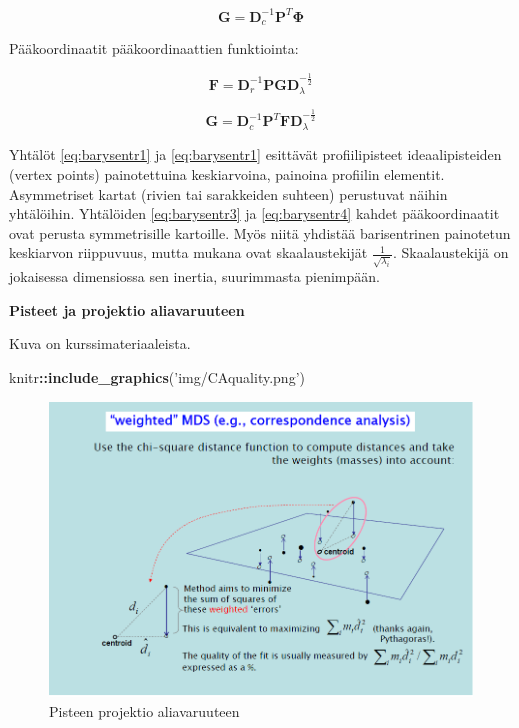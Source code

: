 \documentclass[
  finnish,
]{book}
\newenvironment{Shaded}{\begin{snugshade}}{\end{snugshade}}
\newcommand{\KeywordTok}[1]{\textcolor[rgb]{0.13,0.29,0.53}{\textbf{#1}}}
\newcommand{\NormalTok}[1]{#1}
\newcommand{\OperatorTok}[1]{\textcolor[rgb]{0.81,0.36,0.00}{\textbf{#1}}}
\newcommand{\StringTok}[1]{\textcolor[rgb]{0.31,0.60,0.02}{#1}}
\begin{document}
\begin{equation}
\boldsymbol{G} = \boldsymbol{D}_{c}^{-1} \boldsymbol{P}^{T}\boldsymbol{\Phi}
\label{eq:barysentr2}
\end{equation}

Pääkoordinaatit pääkoordinaattien funktiointa:

\begin{equation}
\boldsymbol{F} = \boldsymbol{D}_{r}^{-1} \boldsymbol{P}\boldsymbol{G}\boldsymbol{D}_{\lambda}^{-\frac{1}{2}}
\label{eq:barysentr3}
\end{equation}

\begin{equation}
\boldsymbol{G} = \boldsymbol{D}_{c}^{-1} \boldsymbol{P}^{T}\boldsymbol{F}\boldsymbol{D}_{\lambda}^{-\frac{1}{2}}
\label{eq:barysentr4}
\end{equation}

Yhtälöt \eqref{eq:barysentr1} ja \eqref{eq:barysentr1} esittävät profiilipisteet ideaalipisteiden (vertex points)
painotettuina keskiarvoina, painoina profiilin elementit. Asymmetriset kartat
(rivien tai sarakkeiden suhteen) perustuvat näihin yhtälöihin. Yhtälöiden \eqref{eq:barysentr3}
ja \eqref{eq:barysentr4} kahdet pääkoordinaatit ovat perusta symmetrisille kartoille. Myös niitä
yhdistää barisentrinen painotetun keskiarvon riippuvuus, mutta mukana ovat skaalaustekijät
\(\frac{1}{\sqrt{\lambda_{i}}}\). Skaalaustekijä on jokaisessa dimensiossa sen inertia, suurimmasta pienimpään.

\textbf{Pisteet ja projektio aliavaruuteen}

Kuva on kurssimateriaaleista\citep{RefWorks:doc:5b6ef091e4b0984fd9b8c0ca}.

\begin{Shaded}
\begin{Highlighting}[]
\NormalTok{knitr}\OperatorTok{::}\KeywordTok{include_graphics}\NormalTok{(}\StringTok{'img/CAquality.png'}\NormalTok{)}
\end{Highlighting}
\end{Shaded}

\begin{figure}

{\centering \includegraphics[width=0.7\linewidth]{img/CAquality} 

}

\caption{Pisteen projektio aliavaruuteen}\label{fig:projectionimg1}
\end{figure}
\end{document}
